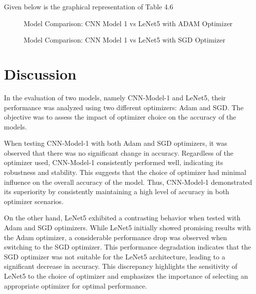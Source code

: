 \clearpage

\noindent Given below is the graphical representation of Table 4.6

\begin{figure}[htbp]
  \centering

  \hfill
  \caption{Model Comparison: CNN Model 1 vs LeNet5 with ADAM Optimizer}

  \vspace{0.5cm} %

  \hfill
  \caption{Model Comparison: CNN Model 1 vs LeNet5 with SGD Optimizer}
  
\end{figure}

\section{Discussion}

In the evaluation of two models, namely CNN-Model-1 and LeNet5, their performance was analyzed using two different optimizers: Adam and SGD. The objective was to assess the impact of optimizer choice on the accuracy of the models.

\noindent When testing CNN-Model-1 with both Adam and SGD optimizers, it was observed that there was no significant change in accuracy. Regardless of the optimizer used, CNN-Model-1 consistently performed well, indicating its robustness and stability. This suggests that the choice of optimizer had minimal influence on the overall accuracy of the model. Thus, CNN-Model-1 demonstrated its superiority by consistently maintaining a high level of accuracy in both optimizer scenarios.

\clearpage

\noindent On the other hand, LeNet5 exhibited a contrasting behavior when tested with Adam and SGD optimizers. While LeNet5 initially showed promising results with the Adam optimizer, a considerable performance drop was observed when switching to the SGD optimizer. This performance degradation indicates that the SGD optimizer was not suitable for the LeNet5 architecture, leading to a significant decrease in accuracy. This discrepancy highlights the sensitivity of LeNet5 to the choice of optimizer and emphasizes the importance of selecting an appropriate optimizer for optimal performance.

